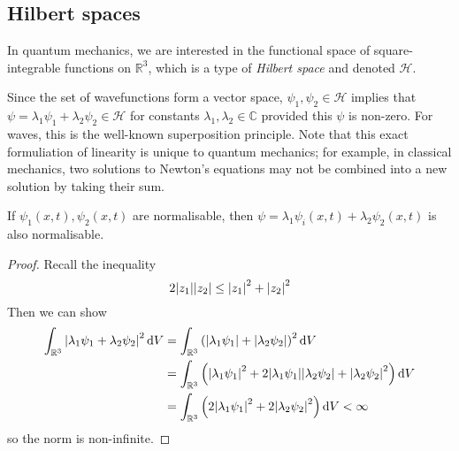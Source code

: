 \subsection{Hilbert spaces}
In quantum mechanics, we are interested in the functional space of square-integrable functions on \( \mathbb R^3 \), which is a type of \textit{Hilbert space} and denoted \( \mathcal H \).
\begin{remark}
	Since the set of wavefunctions form a vector space, \( \psi_1, \psi_2 \in \mathcal H \) implies that \( \psi = \lambda_1 \psi_1 + \lambda_2 \psi_2 \in \mathcal H \) for constants \( \lambda_1, \lambda_2 \in \mathbb C \) provided this \( \psi \) is non-zero.
	For waves, this is the well-known superposition principle.
	Note that this exact formuliation of linearity is unique to quantum mechanics; for example, in classical mechanics, two solutions to Newton's equations may not be combined into a new solution by taking their sum.
\end{remark}
\begin{proposition}
	If \( \psi_1(x,t), \psi_2(x,t) \) are normalisable, then \( \psi = \lambda_1 \psi_i(x,t) + \lambda_2 \psi_2(x,t) \) is also normalisable.
\end{proposition}
\begin{proof}
	Recall the inequality
	\[
		2 \abs{z_1} \abs{z_2} \leq \abs{z_1}^2 + \abs{z_2}^2
	\]
	Then we can show
	\begin{align*}
		\int_{\mathbb R^3}\abs{\lambda_1 \psi_1 + \lambda_2 \psi_2}^2 \dd{V} & = \int_{\mathbb R^3}\qty(\abs{\lambda_1 \psi_1} + \abs{\lambda_2 \psi_2})^2 \dd{V}                                                   \\
		                                                                     & = \int_{\mathbb R^3}\qty(\abs{\lambda_1 \psi_1}^2 + 2\abs{\lambda_1 \psi_1}\abs{\lambda_2 \psi_2} + \abs{\lambda_2 \psi_2}^2) \dd{V} \\
		                                                                     & = \int_{\mathbb R^3}\qty(2\abs{\lambda_1 \psi_1}^2 + 2\abs{\lambda_2 \psi_2}^2) \dd{V} < \infty                                      \\
	\end{align*}
	so the norm is non-infinite.
\end{proof}

